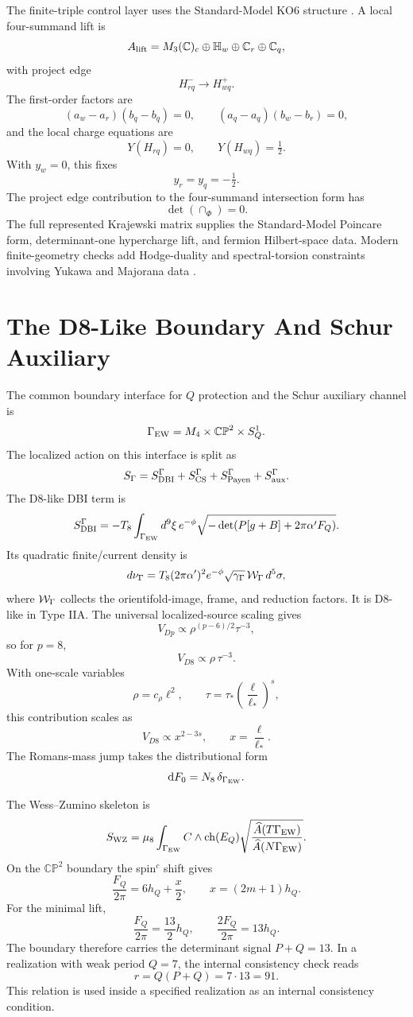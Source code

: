 \documentclass[11pt]{article}
\theoremstyle{definition}
\theoremstyle{remark}
\newcommand{\CP}{\mathbb{CP}}
\newcommand{\C}{\mathbb{C}}
\newcommand{\dd}{\mathrm d}
\newcommand{\half}{\tfrac12}
\begin{document}
The finite-triple control layer uses the Standard-Model KO6 structure
\cite{ChamseddineConnesMarcolli2007,Stephan2009,DAndreaDabrowski2016}.  A
local four-summand lift is
\[
  A_{\rm lift}=
  M_3(\C)_c\oplus{\mathbb H}_w\oplus\C_r\oplus\C_q,
\]
with project edge
\[
  H_{rq}^-\longrightarrow H_{wq}^+.
\]
The first-order factors are
\[
  (a_w-a_r)(b_q-b_q)=0,
  \qquad
  (a_q-a_q)(b_w-b_r)=0,
\]
and the local charge equations are
\[
  Y(H_{rq})=0,\qquad Y(H_{wq})=\half.
\]
With \(y_w=0\), this fixes
\[
  y_r=y_q=-\half.
\]
The project edge contribution to the four-summand intersection form has
\[
  \det(\cap_\Phi)=0.
\]
The full represented Krajewski matrix supplies the Standard-Model Poincare
form, determinant-one hypercharge lift, and fermion Hilbert-space data.
Modern finite-geometry checks add Hodge-duality and spectral-torsion
constraints involving Yukawa and Majorana data
\cite{DabrowskiSitarz2019,DabrowskiMukhopadhyayPozar2025}.

\section{The D8-Like Boundary And Schur Auxiliary}

The common boundary interface for \(Q\) protection and the Schur auxiliary
channel is
\[
  \Gamma_{\rm EW}=M_4\times\CP^2\times S^1_Q.
\]
The localized action on this interface is split as
\[
  S_\Gamma
  =
  S_{\rm DBI}^{\Gamma}
  +S_{\rm CS}^{\Gamma}
  +S_{\rm Payen}^{\Gamma}
  +S_{\rm aux}^{\Gamma}.
\]
The D8-like DBI term is
\[
  S_{\rm DBI}^{\Gamma}
  =
  -T_8\int_{\Gamma_{\rm EW}}d^9\xi\,
  e^{-\phi}
  \sqrt{-\det\!\left(P[g+B]+2\pi\alpha'F_Q\right)} .
\]
Its quadratic finite/current density is
\[
  d\nu_\Gamma
  =
  T_8(2\pi\alpha')^2e^{-\phi}\sqrt{\gamma_\Gamma}\,
  {\cal W}_\Gamma\,d^5\sigma ,
\]
where \({\cal W}_\Gamma\) collects the orientifold-image, frame, and
reduction factors.
It is D8-like in Type IIA.  The universal localized-source scaling gives
\[
  V_{Dp}\propto \rho^{(p-6)/2}\tau^{-3},
\]
so for \(p=8\),
\[
  V_{D8}\propto \rho\,\tau^{-3}.
\]
With one-scale variables
\[
  \rho=c_\rho\ell^2,\qquad
  \tau=\tau_*\left(\frac{\ell}{\ell_*}\right)^s,
\]
this contribution scales as
\[
  V_{D8}\propto x^{2-3s},
  \qquad x=\frac{\ell}{\ell_*}.
\]
The Romans-mass jump takes the distributional form
\[
  \dd F_0=N_8\,\delta_{\Gamma_{\rm EW}}.
\]

The Wess--Zumino skeleton is
\[
  S_{\rm WZ}
  =
  \mu_8\int_{\Gamma_{\rm EW}}
  C\wedge{\rm ch}(E_Q)
  \sqrt{\frac{\widehat A(T\Gamma_{\rm EW})}
             {\widehat A(N\Gamma_{\rm EW})}}.
\]
On the \(\CP^2\) boundary the spin\(^c\) shift gives
\[
  \frac{F_Q}{2\pi}=6h_Q+\frac{x}{2},
  \qquad x=(2m+1)h_Q.
\]
For the minimal lift,
\[
  \frac{F_Q}{2\pi}=\frac{13}{2}h_Q,
  \qquad
  \frac{2F_Q}{2\pi}=13h_Q.
\]
The boundary therefore carries the determinant signal \(P+Q=13\).  In a
realization with weak period \(Q=7\), the internal consistency check reads
\[
  r=Q(P+Q)=7\cdot13=91.
\]
This relation is used inside a specified realization as an internal
consistency condition.
\end{document}
